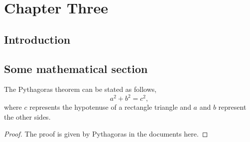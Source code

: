 \chapter{Chapter Three}
\label{Chap3}

\section{Introduction}

\blindtext[5]

\section{Some mathematical section}

\begin{theorem}
The Pythagoras theorem can be stated as follows,
\begin{equation}
a^{2} + b^2 = c^{2}, 
\end{equation}
where $c$ represents the hypotenuse of a rectangle triangle and $a$ and $b$ represent the other sides.
\end{theorem}

\begin{proof}
The proof is given by Pythagoras in the documents here.
\end{proof}